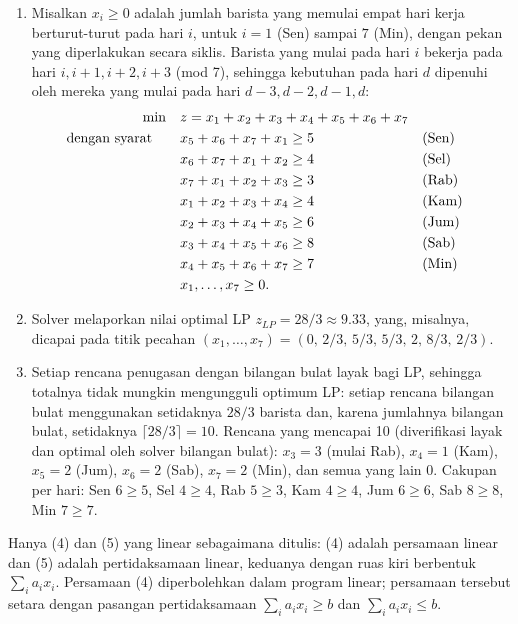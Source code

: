 
\begin{enumerate}
\item Misalkan $x_i \geq 0$ adalah jumlah barista yang memulai empat hari kerja berturut-turut pada hari $i$, untuk $i = 1$ (Sen) sampai $7$ (Min), dengan pekan yang diperlakukan secara siklis. Barista yang mulai pada hari $i$ bekerja pada hari $i, i+1, i+2, i+3$ (mod 7), sehingga kebutuhan pada hari $d$ dipenuhi oleh mereka yang mulai pada hari $d-3, d-2, d-1, d$:
\begin{align*}
\min \quad & z = x_1 + x_2 + x_3 + x_4 + x_5 + x_6 + x_7\\
\mbox{dengan syarat}\quad \quad & x_5 + x_6 + x_7 + x_1 \geq 5 && \mbox{(Sen)}\\
& x_6 + x_7 + x_1 + x_2 \geq 4 && \mbox{(Sel)}\\
& x_7 + x_1 + x_2 + x_3 \geq 3 && \mbox{(Rab)}\\
& x_1 + x_2 + x_3 + x_4 \geq 4 && \mbox{(Kam)}\\
& x_2 + x_3 + x_4 + x_5 \geq 6 && \mbox{(Jum)}\\
& x_3 + x_4 + x_5 + x_6 \geq 8 && \mbox{(Sab)}\\
& x_4 + x_5 + x_6 + x_7 \geq 7 && \mbox{(Min)}\\
& x_1, \dots, x_7 \geq 0.
\end{align*}
\item Solver melaporkan nilai optimal LP $z_{LP} = 28/3 \approx 9.33$, yang, misalnya, dicapai pada titik pecahan $(x_1,\dots,x_7) = (0,\, 2/3,\, 5/3,\, 5/3,\, 2,\, 8/3,\, 2/3)$.
\item Setiap rencana penugasan dengan bilangan bulat layak bagi LP, sehingga totalnya tidak mungkin mengungguli optimum LP: setiap rencana bilangan bulat menggunakan setidaknya $28/3$ barista dan, karena jumlahnya bilangan bulat, setidaknya $\lceil 28/3 \rceil = 10$. Rencana yang mencapai 10 (diverifikasi layak dan optimal oleh solver bilangan bulat): $x_3 = 3$ (mulai Rab), $x_4 = 1$ (Kam), $x_5 = 2$ (Jum), $x_6 = 2$ (Sab), $x_7 = 2$ (Min), dan semua yang lain 0. Cakupan per hari: Sen $6 \geq 5$, Sel $4 \geq 4$, Rab $5 \geq 3$, Kam $4 \geq 4$, Jum $6 \geq 6$, Sab $8 \geq 8$, Min $7 \geq 7$.
\end{enumerate}


Hanya (4) dan (5) yang linear sebagaimana ditulis: (4) adalah persamaan linear dan (5) adalah pertidaksamaan linear, keduanya dengan ruas kiri berbentuk $\sum_i a_i x_i$. Persamaan (4) diperbolehkan dalam program linear; persamaan tersebut setara dengan pasangan pertidaksamaan $\sum_i a_i x_i \geq b$ dan $\sum_i a_i x_i \leq b$.

